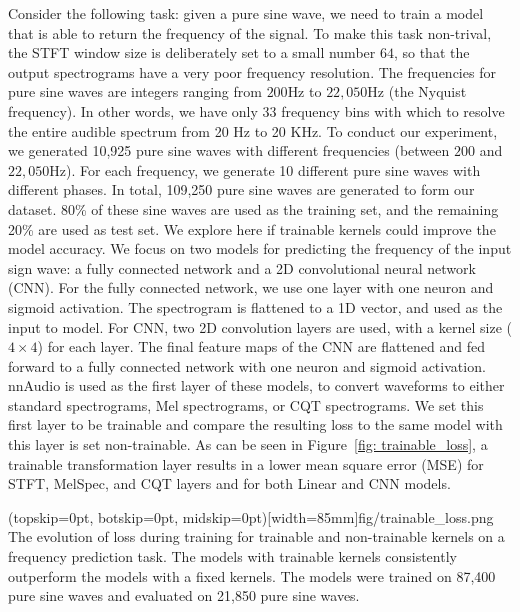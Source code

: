 \documentclass{ieeeaccess}
\begin{document}
 
Consider the following task: given a pure sine wave, we need to train a model that is able to return the frequency of the signal. To make this task non-trival, the STFT window size is deliberately set to a small number $64$, so that the output spectrograms have a very poor frequency resolution. The frequencies for pure sine waves are integers ranging from $200$Hz to $22,050$Hz (the Nyquist frequency). In other words, we have only $33$ frequency bins with which to resolve the entire audible spectrum from 20 Hz to 20 KHz. To conduct our experiment, we generated 10,925 pure sine waves with different frequencies (between $200$ and $22,050$Hz). For each frequency, we generate 10 different pure sine waves with different phases. In total, 109,250 pure sine waves are generated to form our dataset. 80\% of these sine waves are used as the training set, and the remaining 20\% are used as test set. We explore here if trainable kernels could improve the model accuracy. We focus on two models for predicting the frequency of the input sign wave: a fully connected network and a 2D convolutional neural network (CNN). For the fully connected network, we use one layer with one neuron and sigmoid activation. The spectrogram is flattened to a 1D vector, and used as the input to model. For CNN, two 2D convolution layers are used, with a kernel size ($4\times4$) for each layer. The final feature maps of the CNN are flattened and fed forward to a fully connected network with one neuron and sigmoid activation. nnAudio is used as the first layer of these models, to convert waveforms to either standard spectrograms, Mel spectrograms, or CQT spectrograms. We set this first layer to be trainable and compare the resulting loss to the same model with this layer is set non-trainable. As can be seen in Figure~\ref{fig: trainable_loss}, a trainable transformation layer results in a lower mean square error (MSE) for STFT, MelSpec, and CQT layers and for both Linear and CNN models.


\Figure(topskip=0pt, botskip=0pt, midskip=0pt)[width=85mm]{fig/trainable_loss.png}
{The evolution of loss during training for trainable and non-trainable kernels on a frequency prediction task. The models with trainable kernels consistently outperform the models with a fixed kernels. The models were trained on 87,400 pure sine waves and evaluated on 21,850 pure sine waves.\label{fig: trainable_loss}}
\end{document}
